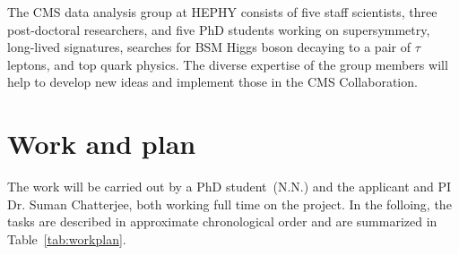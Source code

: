 \documentclass[a4paper,11pt]{article}
\begin{document}
The CMS data analysis group at HEPHY consists of five staff scientists,  three post-doctoral researchers,  and five PhD students working on supersymmetry, long-lived signatures,  searches for BSM Higgs boson decaying to a pair of $\tau$ leptons,  and top quark physics. 
The diverse expertise of the group members will help
to develop new ideas and implement those in the CMS Collaboration.

\section{Work and plan}

The work will be carried out by a PhD student~(N.N.) and the applicant and PI Dr. Suman Chatterjee, both working full time on the project. 
In the folloing, the tasks are described in approximate chronological order and are summarized in Table~\ref{tab:workplan}.%
\end{document}
